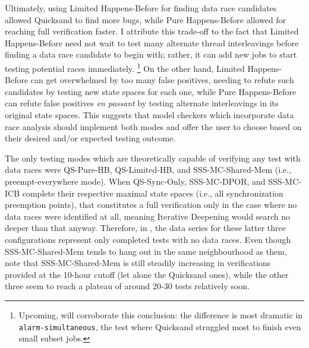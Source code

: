 Ultimately, using Limited Happens-Before for finding data race candidates allowed Quicksand to find more bugs,
while Pure Happens-Before allowed for reaching full verification faster.
I attribute this trade-off to the fact that
Limited Happens-Before need not wait to test many alternate thread interleavings before
finding a data race candidate to begin with;
rather, it can add new jobs to start testing potential races immediately.%
\footnote{Upcoming,  will corroborate this conclusion:
the difference is most dramatic in {\tt alarm-\allowbreak{}simultaneous},
the test where Quicksand struggled most to finish even small subset jobs.}
%
On the other hand, Limited Happens-Before can get overwhelmed by too many false positives,
needing to refute such candidates by testing new state spaces for each one,
while Pure Happens-Before can refute false positives {\em en passant}
by testing alternate interleavings in its original state spaces.
This suggests that
model checkers which incorporate data race analysis should implement both modes
and offer the user to choose based on their desired and/or expected testing outcome.

The only testing modes which are theoretically capable of verifying any test with data races
were QS-Pure-HB, QS-Limited-HB, and SSS-MC-Shared-Mem (i.e., preempt-everywhere mode).
When QS-Sync-Only, SSS-MC-DPOR, and SSS-MC-ICB
complete their respective maximal state spaces (i.e., all synchronization preemption points),
that constitutes a full verification only in the case where no data races were identified at all,
meaning Iterative Deepening would search no deeper than that anyway.
Therefore, in ,
the data series for these latter three configurations
represent only completed tests with no data races.
Even though SSS-MC-Shared-Mem tends to hang out in the same neighbourhood as them,
note that SSS-MC-Shared-Mem is still steadily increasing in verifications provided at the 10-hour cutoff
(let alone the Quicksand ones),
while the other three seem to reach a plateau of around 20-30 tests relatively soon.


